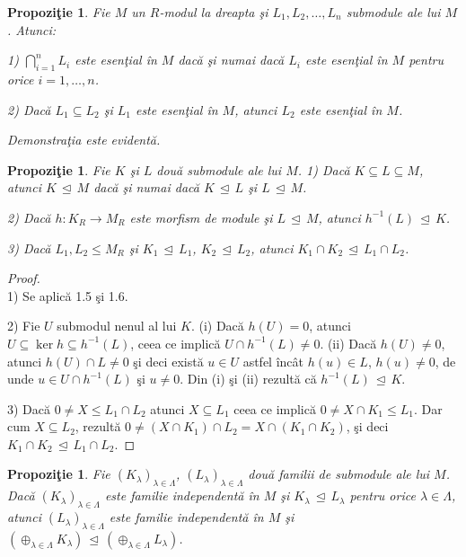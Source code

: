 \documentclass[12pt,a4paper]{book}
\newcommand{\ess}{\trianglelefteq}  %
\theoremstyle{plain}
\newtheorem{proposition}[theorem]{Propoziţie}
\theoremstyle{definition}
\theoremstyle{remark}
\begin{document}
\begin{proposition}
Fie \(M\) un \(R\)-modul la dreapta şi \(L_1, L_2, \ldots, L_n\) submodule ale lui \(M\).
Atunci:

1) \(\displaystyle \bigcap_{i=1}^n L_i\) este esenţial în \(M\) dacă şi numai dacă
\(L_i\) este esenţial în \(M\) pentru orice \(i = 1,\ldots,n\).

2) Dacă \(L_1 \subseteq L_2\) şi \(L_1\) este esenţial în \(M\), atunci
\(L_2\) este esenţial în \(M\).

Demonstraţia este evidentă.
\end{proposition}



\begin{proposition}
Fie \(K\) şi \(L\) două submodule ale lui \(M\).
1) Dacă \(K \subseteq L \subseteq M\), atunci \(K \, \ess \, M\) dacă şi numai dacă
\(K \, \ess \, L\) şi \(L \, \ess \, M\).

2) Dacă \(h : K_R \to M_R\) este morfism de module şi \(L \, \ess \, M\),
atunci \(h^{-1}(L) \, \ess \, K\).

3) Dacă \(L_1, L_2 \leq M_R\) şi \(K_1 \, \ess \, L_1\), \(K_2 \, \ess \, L_2\),
atunci \(K_1 \cap K_2 \, \ess \, L_1 \cap L_2\).
\end{proposition}

\begin{proof}
\mbox{}\\[0.1em]
1) Se aplică 1.5 şi 1.6.

2) Fie \(U\) submodul nenul al lui \(K\).
(i) Dacă \(h(U) = 0\), atunci \(U \subseteq \ker h \subseteq h^{-1}(L)\),
ceea ce implică \(U \cap h^{-1}(L) \neq 0\).
(ii) Dacă \(h(U) \neq 0\), atunci \(h(U) \cap L \neq 0\) şi deci există
\(u \in U\) astfel încât \(h(u) \in L\), \(h(u) \neq 0\), de unde
\(u \in U \cap h^{-1}(L)\) şi \(u \neq 0\).
Din (i) şi (ii) rezultă că \(h^{-1}(L) \, \ess \, K\).

3) Dacă \(0 \neq X \leq L_1 \cap L_2\) atunci \(X \subseteq L_1\) ceea ce implică
\(0 \neq X \cap K_1 \leq L_1\). Dar cum \(X \subseteq L_2\),
rezultă \(0 \neq (X \cap K_1) \cap L_2 = X \cap (K_1 \cap K_2)\),
şi deci \(K_1 \cap K_2 \, \ess \, L_1 \cap L_2\).
\end{proof}


\begin{proposition}
Fie \((K_\lambda)_{\lambda \in \Lambda}\), \((L_\lambda)_{\lambda \in \Lambda}\)
două familii de submodule ale lui \(M\).
Dacă \((K_\lambda)_{\lambda \in \Lambda}\) este familie independentă în \(M\)
şi \(K_\lambda \, \ess \, L_\lambda\) pentru orice \(\lambda \in \Lambda\),
atunci \((L_\lambda)_{\lambda \in \Lambda}\) este familie independentă în \(M\)
şi \((\oplus_{\lambda \in \Lambda} K_\lambda) \, \ess \,
(\oplus_{\lambda \in \Lambda} L_\lambda)\).
\end{proposition}
\end{document}

